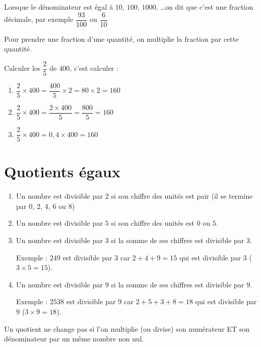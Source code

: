 \documentclass[a4paper,10pt]{report}
\begin{document}
\begin{rem}
Lorsque le dénominateur est égal à $10$, $100$, $1000$, \dots on dit que c'est une fraction décimale, par exemple $\dfrac{93}{100}$ ou $\dfrac{6}{10}$
\end{rem}

\begin{meth}
Pour prendre une fraction d'une quantité, on multiplie la fraction par cette quantité.

\medskip
\noindent Calculer les $\dfrac{2}{5}$ de $400$, c'est calculer :
\begin{enumerate}
\item[•]$\dfrac{2}{5} \times 400 = \dfrac{400}{5} \times 2 = 80 \times 2 = 160$
\item[•]$\dfrac{2}{5} \times 400 = \dfrac{2 \times 400}{5} = \dfrac{800}{5} = 160$
\item[•]$\dfrac{2}{5} \times 400 = 0,4 \times 400 = 160$
\end{enumerate}
\end{meth}

\vspace{-2mm}
\section{Quotients égaux}

\begin{meth}
\begin{enumerate}
\item[•] Un nombre est divisible par $2$ si son chiffre des unités est pair (il se termine par $0$, $2$, $4$, $6$ ou $8$)
\item[•] Un nombre est divisible par $5$ si son chiffre des unités est $0$ ou $5$.
\item[•] Un nombre est divisible par $3$ si la somme de ses chiffres est divisible par $3$.

Exemple : $249$ est divisible par $3$ car $2 + 4 + 9 = 15$ qui est divisible par $3$ ($3 \times 5 = 15$).

\item[•] Un nombre est divisible par $9$ si la somme de ses chiffres est divisible par $9$.

Exemple : $2 538$ est divisible par $9$ car $2 + 5 + 3 + 8 = 18$ qui est divisible par $9$ ($3 \times 9 = 18$).
\end{enumerate}
\end{meth}

\begin{prop}
Un quotient ne change pas si l'on multiplie (ou divise) son numérateur ET son dénominateur par un même nombre non nul.
\end{prop}
\end{document}
